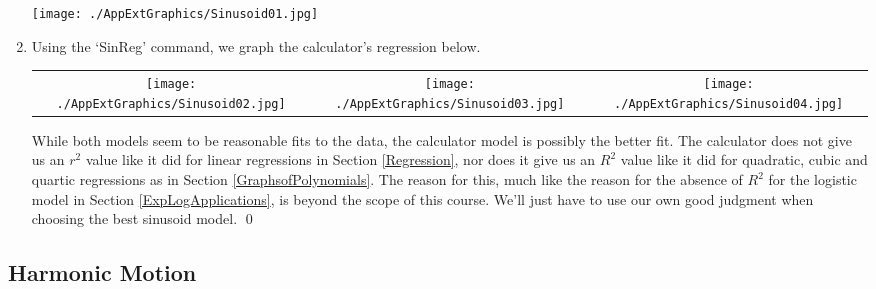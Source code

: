 \begin{ex}
\begin{enumerate}
\begin{center}
\texttt{[image: ./AppExtGraphics/Sinusoid01.jpg]}

\end{center}

\item  Using the `SinReg' command, we graph the calculator's regression below.


\begin{center}

\begin{tabular}{ccc}

\texttt{[image: ./AppExtGraphics/Sinusoid02.jpg]} &
\texttt{[image: ./AppExtGraphics/Sinusoid03.jpg]} & 
\texttt{[image: ./AppExtGraphics/Sinusoid04.jpg]} \\


\end{tabular}
\end{center}

While both models seem to be reasonable fits to the data, the calculator model is possibly the better fit.  The calculator does not give us an $r^{2}$ value like it did for linear regressions in Section \ref{Regression}, nor does it give us an $R^{2}$ value like it did for quadratic, cubic and quartic regressions as in Section \ref{GraphsofPolynomials}.  The reason for this, much like the reason for the absence of $R^{2}$ for the logistic model in Section \ref{ExpLogApplications}, is beyond the scope of this course.  We'll just have to use our own good judgment when choosing the best sinusoid model.  \qed

\end{enumerate}

\end{ex}

\subsection{Harmonic Motion}
\label{harmomicmotion}

